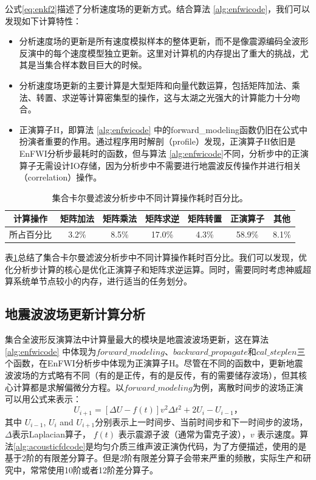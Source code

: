 \documentclass[degree=doctor]{thuthesis}
\begin{document}
公式\ref{eq:enkf2}描述了分析速度场的更新方式。结合算法 \ref{alg:enfwicode}，我们可以发现如下计算特性：
\begin{itemize}
  \item 分析速度场的更新是所有速度模拟样本的整体更新，而不是像震源编码全波形反演中的每个速度模型独立更新。这里对计算机的内存提出了重大的挑战，尤其是当集合样本数目巨大的时候。
  \item 分析速度场更新的主要计算是大型矩阵和向量代数运算，包括矩阵加法、乘法、转置、求逆等计算密集型的操作，这与太湖之光强大的计算能力十分吻合。
  \item 正演算子$\mbox{H}$，即算法 \ref{alg:enfwicode} 中的forward\_modeling函数仍旧在公式中扮演者重要的作用。通过程序用时解剖（profile）发现，正演算子$\mbox{H}$依旧是EnFWI分析步最耗时的函数，但与算法 \ref{alg:enfwicode}不同，分析步中的正演算子无需设计IO存储，因为分析步中不需要进行地震波反传操作并进行相关（correlation）操作。
\end{itemize}

\begin{table}[ht]
\centering
\caption{集合卡尔曼滤波分析步中不同计算操作耗时百分比。}
\label{tb:enkfprofile}
\begin{tabular}{ccccccc}
\hline
计算操作  & 矩阵加法  & 矩阵乘法  & 矩阵求逆   & 矩阵转置  & 正演算子   & 其他    \\\hline
所占百分比 & 3.2\% & 8.5\% & 17.0\% & 4.3\% & 58.9\% & 8.1\% \\\hline
\end{tabular}
\end{table}
表\ref{tb:enkfprofile}总结了集合卡尔曼滤波分析步中不同计算操作耗时百分比。我们可以发现，优化分析步计算的核心是优化正演算子和矩阵求逆运算。同时，需要同时考虑神威超算系统单节点较小的内存，进行适当的任务划分。

\subsection{地震波波场更新计算分析}
集合全波形反演算法中计算量最大的模块是地震波波场更新，这在算法 \ref{alg:enfwicode} 中体现为$forward\_modeling$、$backward\_propagate$和$cal\_steplen$三个函数，在EnFWI分析步中体现为正演算子$\mbox{H}$。尽管在不同的函数中，更新地震波波场的方式略有不同（有的是正传，有的是反传，有的需要储存波场），但其核心计算都是求解偏微分方程。以$forward\_modeling$为例，离散时间步的波场正演可以用公式来表示：
\begin{equation}
\label{eq:enfwifd}
U_{i+1} = \left[ \Delta U -f(t) \right] v^2 \Delta t^2 + 2 U_{i} - U_{i-1}，
\end{equation}
其中 $U_{i-1}$, $U_{i}$ and $U_{i+1}$分别表示上一时间步、当前时间步和下一时间步的波场，$\Delta$表示Laplacian算子，
$f(t)$ 表示震源子波（通常为雷克子波），$v$ 表示速度。算法\ref{alg:acousticfdcode}是均匀介质三维声波正演伪代码，为了方便描述，使用的是基于2阶的有限差分算子\cite{fu2011eliminating}。但是2阶有限差分算子会带来严重的频散，实际生产和研究中，常常使用10阶或者12阶差分算子。
\end{document}
